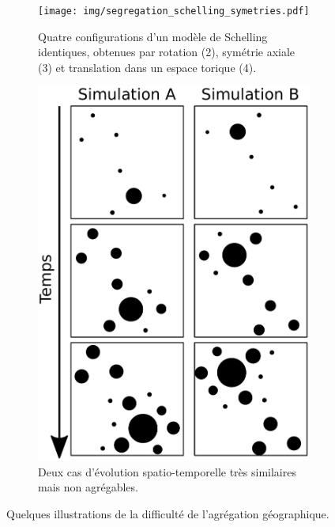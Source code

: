 \documentclass[a4paper, 12pt]{article}
\begin{document}
\begin{figure}[H]
	\centering
	\begin{subfigure}[t]{.45\linewidth}
		\centering
		\texttt{[image: img/segregation\_schelling\_symetries.pdf]}
		\captionsetup{width = 1\linewidth}
		\caption{Quatre configurations d'un modèle de Schelling identiques, obtenues par rotation (2), symétrie axiale (3) et translation dans un espace torique (4).}
		\label{fig:agreg-schelling}
	\end{subfigure}%
	\begin{subfigure}[t]{.45\linewidth}
		\centering
		\includegraphics[width=\linewidth]{img/espace_theoriques.pdf}
		\captionsetup{width = .8\linewidth}
		\caption{Deux cas d'évolution spatio-temporelle très similaires mais non agrégables.}
		\label{fig:agreg-espace}
	\end{subfigure}
	\caption{Quelques illustrations de la difficulté de l'agrégation géographique.}
	\label{fig:agreg-geo}
\end{figure}
\end{document}
